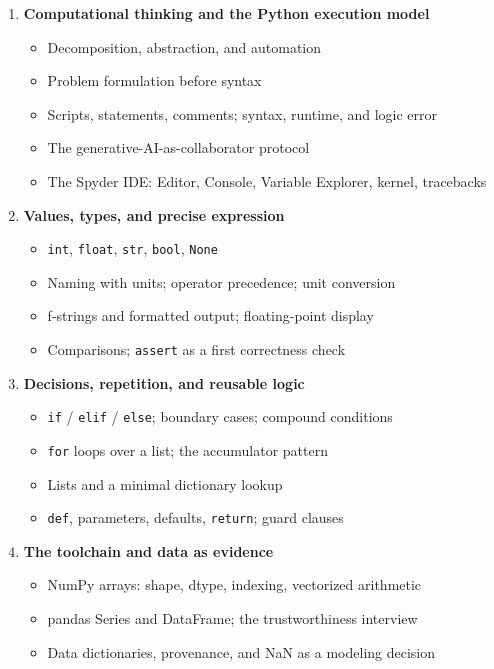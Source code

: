 \documentclass[11pt]{article}
\begin{document}
\begin{enumerate}
  \item \textbf{Computational thinking and the Python execution model}
        \begin{itemize}
          \item Decomposition, abstraction, and automation
          \item Problem formulation before syntax
          \item Scripts, statements, comments; syntax, runtime, and logic error
          \item The generative-AI-as-collaborator protocol
          \item The Spyder IDE: Editor, Console, Variable Explorer, kernel, tracebacks
        \end{itemize}
  \item \textbf{Values, types, and precise expression}
        \begin{itemize}
          \item \texttt{int}, \texttt{float}, \texttt{str}, \texttt{bool}, \texttt{None}
          \item Naming with units; operator precedence; unit conversion
          \item f-strings and formatted output; floating-point display
          \item Comparisons; \texttt{assert} as a first correctness check
        \end{itemize}
  \item \textbf{Decisions, repetition, and reusable logic}
        \begin{itemize}
          \item \texttt{if} / \texttt{elif} / \texttt{else}; boundary cases; compound conditions
          \item \texttt{for} loops over a list; the accumulator pattern
          \item Lists and a minimal dictionary lookup
          \item \texttt{def}, parameters, defaults, \texttt{return}; guard clauses
        \end{itemize}
  \item \textbf{The toolchain and data as evidence}
        \begin{itemize}
          \item NumPy arrays: shape, dtype, indexing, vectorized arithmetic
          \item pandas Series and DataFrame; the trustworthiness interview
          \item Data dictionaries, provenance, and NaN as a modeling decision

\end{itemize}
\end{enumerate}
\end{document}
